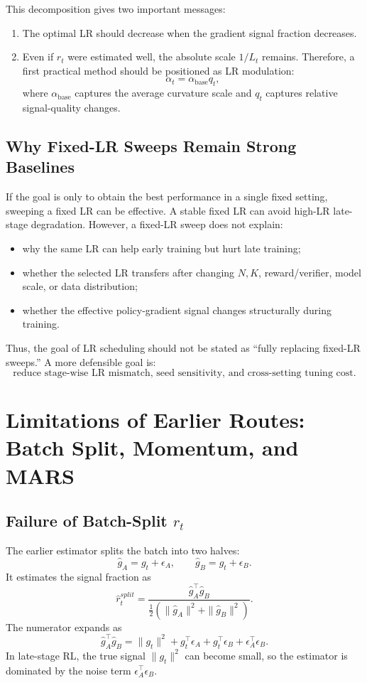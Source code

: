 \documentclass[11pt,a4paper]{article}
\begin{document}
This decomposition gives two important messages:
\begin{enumerate}[leftmargin=2em]
    \item The optimal LR should decrease when the gradient signal fraction decreases.
    \item Even if \(r_t\) were estimated well, the absolute scale \(1/L_t\) remains. Therefore, a first practical method should be positioned as LR modulation:
    \[
    \alpha_t=\alpha_{\mathrm{base}} q_t,
    \]
    where \(\alpha_{\mathrm{base}}\) captures the average curvature scale and \(q_t\) captures relative signal-quality changes.
\end{enumerate}

\subsection{Why Fixed-LR Sweeps Remain Strong Baselines}

If the goal is only to obtain the best performance in a single fixed setting, sweeping a fixed LR can be effective. A stable fixed LR can avoid high-LR late-stage degradation. However, a fixed-LR sweep does not explain:
\begin{itemize}[leftmargin=2em]
    \item why the same LR can help early training but hurt late training;
    \item whether the selected LR transfers after changing \(N,K\), reward/verifier, model scale, or data distribution;
    \item whether the effective policy-gradient signal changes structurally during training.
\end{itemize}

Thus, the goal of LR scheduling should not be stated as ``fully replacing fixed-LR sweeps.'' A more defensible goal is:
\[
\boxed{
\text{reduce stage-wise LR mismatch, seed sensitivity, and cross-setting tuning cost.}
}
\]

\section{Limitations of Earlier Routes: Batch Split, Momentum, and MARS}

\subsection{Failure of Batch-Split \(r_t\)}

The earlier estimator splits the batch into two halves:
\[
\hat g_A=g_t+\epsilon_A,\qquad
\hat g_B=g_t+\epsilon_B.
\]
It estimates the signal fraction as
\[
\hat r_t^{split}
=
\frac{\hat g_A^\top \hat g_B}
{\frac{1}{2}(\|\hat g_A\|^2+\|\hat g_B\|^2)}.
\]
The numerator expands as
\[
\hat g_A^\top \hat g_B
=
\|g_t\|^2
+
g_t^\top \epsilon_A
+
g_t^\top \epsilon_B
+
\epsilon_A^\top \epsilon_B.
\]
In late-stage RL, the true signal \(\|g_t\|^2\) can become small, so the estimator is dominated by the noise term \(\epsilon_A^\top\epsilon_B\).
\end{document}
